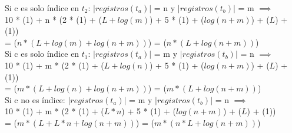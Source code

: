 {    \hspace*{8.25em} Si c es solo índice en $t_2$: $|registros(t_a)|$ = n y $|registros(t_b)|$ = m $\implies$ \\
    \hspace*{12em} 10 * \bigo(1) + n * (2 * \bigo(1) + \bigo($L + log(m)$) + 5 * \bigo(1) + \bigo($log(n + m)$) + \bigo($L$) + \bigo(1)) \\
    \hspace*{12em} = \bigo($n * (L + log(m) + log(n + m))$) = \bigo($n * (L + log(n + m))$) \\

    \hspace*{8.25em} Si c es solo índice en $t_1$: $|registros(t_a)|$ = m y $|registros(t_b)|$ = n $\implies$ \\
    \hspace*{12em} 10 * \bigo(1) + m * (2 * \bigo(1) + \bigo($L + log(n)$) + 5 * \bigo(1) + \bigo($log(n + m)$) + \bigo($L$) + \bigo(1)) \\
    \hspace*{12em} = \bigo($m * (L + log(n) + log(n + m))$) = \bigo($m * (L + log(n + m))$) \\

    \hspace*{8.25em} Si c no es índice: $|registros(t_a)|$ = m y $|registros(t_b)|$ = n $\implies$ \\
    \hspace*{12em} 10 * \bigo(1) + m * (2 * \bigo(1) + \bigo($L * n$) + 5 * \bigo(1) + \bigo($log(n + m)$) + \bigo($L$) + \bigo(1)) \\
    \hspace*{12em} = \bigo($m * (L + L * n + log(n + m))$) = \bigo($m * (n * L + log(n + m))$) \\
}





